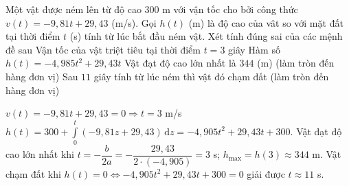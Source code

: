 \begin{ex}%
Một vật được ném lên từ độ cao $300$ m với vận tốc cho bởi công thức $v(t)=-9{,}81t+29{,}43$ (m/s). Gọi $h(t)$ (m) là độ cao của vât so với mặt đất tại thời điểm $t$ (s) tính từ lúc bắt đầu ném vật. Xét tính đúng sai của các mệnh đề sau
\choiceTF
{\True Vận tốc của vật triệt tiêu tại thời điểm $t=3$ giây}
{Hàm số $h(t)=-4{,}985t^2+29{,}43t$}
{\True Vật đạt độ cao lớn nhất là $344$ (m) (làm tròn đến hàng đơn vị)}
{\True Sau $11$ giây tính từ lúc ném thì vật đó chạm đất (làm tròn đến hàng đơn vị)}
\loigiai
{
\begin{itemchoice}
\itemch  $v(t)=-9{,}81t+29{,}43=0\Rightarrow t=3$ m/s
\itemch  $h(t) = 300+\displaystyle \int\limits_{0}^t\left(-9{,}81z+29{,}43\right)\mathrm{\,d}z=-4,905t^2 + 29,43t + 300$.
\itemch Vật đạt độ cao lớn nhất khi $t =-\dfrac{b}{2a}=-\dfrac{29{,}43}{2\cdot \left(-4{,}905\right)} = 3$ s; $h_{\text{max}}=h(3) \approx 344$ m.
\itemch Vật chạm đất khi $h(t)=0\Leftrightarrow -4,905t^2 + 29,43t + 300 = 0$ giải được $t \approx 11$ s.
\end{itemchoice}
}
\end{ex}


